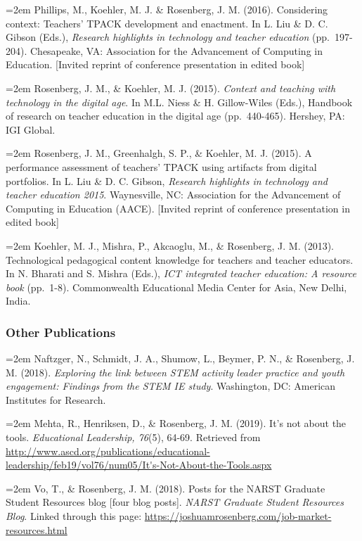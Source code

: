 \documentclass[14,]{article}
\begin{document}
\hangindent=2em Phillips, M., Koehler, M. J. \& Rosenberg, J. M. (2016).
Considering context: Teachers' TPACK development and enactment. In L.
Liu \& D. C. Gibson (Eds.), \emph{Research highlights in technology and
teacher education} (pp.~197-204). Chesapeake, VA: Association for the
Advancement of Computing in Education. {[}Invited reprint of conference
presentation in edited book{]}

\hangindent=2em Rosenberg, J. M., \& Koehler, M. J. (2015).
\emph{Context and teaching with technology in the digital age}. In M.L.
Niess \& H. Gillow-Wiles (Eds.), Handbook of research on teacher
education in the digital age (pp.~440-465). Hershey, PA: IGI Global.

\hangindent=2em Rosenberg, J. M., Greenhalgh, S. P., \& Koehler, M. J.
(2015). A performance assessment of teachers' TPACK using artifacts from
digital portfolios. In L. Liu \& D. C. Gibson, \emph{Research highlights
in technology and teacher education 2015}. Waynesville, NC: Association
for the Advancement of Computing in Education (AACE). {[}Invited reprint
of conference presentation in edited book{]}

\hangindent=2em Koehler, M. J., Mishra, P., Akcaoglu, M., \& Rosenberg,
J. M. (2013). Technological pedagogical content knowledge for teachers
and teacher educators. In N. Bharati and S. Mishra (Eds.), \emph{ICT
integrated teacher education: A resource book} (pp.~1-8). Commonwealth
Educational Media Center for Asia, New Delhi, India.

\subsubsection{Other Publications}\label{other-publications}

\hangindent=2em Naftzger, N., Schmidt, J. A., Shumow, L., Beymer, P. N.,
\& Rosenberg, J. M. (2018). \emph{Exploring the link between STEM
activity leader practice and youth engagement: Findings from the STEM IE
study}. Washington, DC: American Institutes for Research.

\hangindent=2em Mehta, R., Henriksen, D., \& Rosenberg, J. M. (2019).
It's not about the tools. \emph{Educational Leadership, 76}(5), 64-69.
Retrieved from
\url{http://www.ascd.org/publications/educational-leadership/feb19/vol76/num05/It's-Not-About-the-Tools.aspx}

\hangindent=2em Vo, T., \& Rosenberg, J. M. (2018). Posts for the NARST
Graduate Student Resources blog {[}four blog posts{]}. \emph{NARST
Graduate Student Resources Blog}. Linked through this page:
\url{https://joshuamrosenberg.com/job-market-resources.html}
\end{document}
